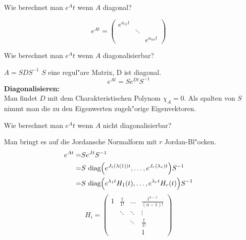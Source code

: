 \documentclass[9pt]{article}
\newenvironment{field}{}{\newpage}
\newif\ifnote
\newenvironment{note}{\notetrue}{\notefalse}
\newcommand{\localtag}{}
\newcommand{\globaltag}{}
\newcommand{\uuid}{}
\newcommand{\tags}[1]{
    \ifnote 
        \renewcommand{\localtag}{#1}
    \else
        \renewcommand{\globaltag}{#1}
    \fi 
    }
\newcommand{\xplain}[1]{\renewcommand{\uuid}{#1}}
\begin{document}
		\begin{note}
			\xplain{UUID}
			\tags{LDGLS, konstante-koeffizienten, 3.9.4}
			
			\begin{field}  %
				Wie berechnet man $e^At$ wenn $A$ diagonal?
			\end{field}
			
			\begin{field}  %
				\begin{equation*}
					e^{At} = 
						\begin{pmatrix}
					     e^{a_{11}t} & 		&			\\
					     			&\ddots &			 \\
					     			&		&e^{a_{nn}t}
						\end{pmatrix}
				\end{equation*}
			\end{field}
				
			\begin{field}  %
				Wie berechnet man $e^At$ wenn $A$ diagonalisierbar?
			\end{field}
			
			\begin{field}  %

				$A=SDS^{-1}$ $S$ eine regul"are Matrix, D ist diagonal. 
				\begin{equation*}
				e^{At} = Se^{Dt}S^{-1}
				\end{equation*}
				\textbf{Diagonalisieren:}\\
		
				Man findet $D$ mit dem Charakteristischen Polynom  $ \chi_A=0$. Als spalten von $S$ nimmt man die zu den Eigenwerten zugeh"orige Eigenvektoren.  	 
			\end{field}
				
			\begin{field}  %
					Wie berechnet man $e^At$ wenn $A$ nicht diagonalisierbar?
			\end{field}
			
			\begin{field}  %
				Man bringt es auf die Jordansche Normalform mit $r$ Jordan-Bl"ocken.
				\begin{align*}
					e^{At} =& Se^{Jt}S^{-1}\\
						   =& S \ \text{diag}\qty(e^{J_1(\lambda(1))t}, \dots, e^{J_r(\lambda_r)t}) S^{-1} \\
						   =&S \ \text{diag}\qty(e^{\lambda_1 t}H_1(t), \dots, e^{\lambda_r t}H_r(t)) S^{-1}
				\end{align*}
				\begin{equation*}
				H_i = 
					\begin{pmatrix}
						1 & \frac{t}{1!} & \dots  & \frac{t^{n-1}}{(n-1)!} \\
						  & \ddots       & \ddots & \vdots                 \\
						  &              & \ddots & \frac{t}{1!}           \\
						  &              &        & 1
					\end{pmatrix}	
				\end{equation*}
			\end{field}
		\end{note}
\end{document}
